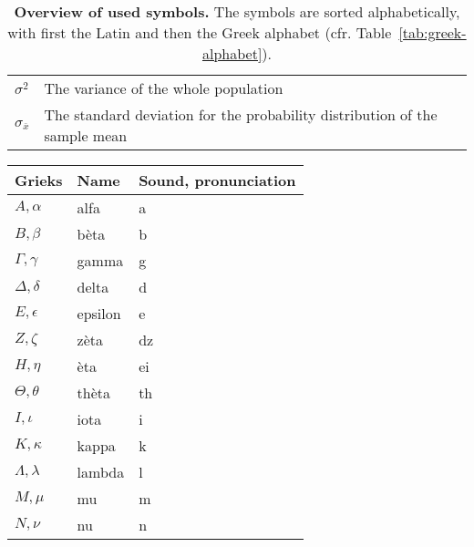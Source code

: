 \begin{table}
\begin{tabular}{p{}p{}}
  	$\sigma^2$                                              & The variance of the whole population                                                                                              \\
  	$\sigma_{\overline{x}}$                                 & The standard deviation for the probability distribution of the sample mean                                                        \\
  	\bottomrule
  \end{tabular}
  \caption[Overview of used symbols.]{\textbf{Overview of used symbols.} The symbols are sorted alphabetically, with first the Latin and then the Greek alphabet (cfr. Table~\ref{tab:greek-alphabet}).}
  \label{tab:notatie}
\end{table}

\begin{table}
  \centering
  \begin{tabular}{lll}
  	\toprule
  	\textbf{Grieks}              & \textbf{Name} & \textbf{Sound, pronunciation} \\
  	\midrule
  	$A, \alpha$                  & alfa          & a                           \\
  	$B, \beta$                   & bèta          & b                           \\
  	$\Gamma, \gamma$             & gamma         & g                           \\
  	$\Delta, \delta$             & delta         & d                           \\
  	$E, \epsilon$                & epsilon       & e                           \\
  	$Z, \zeta$                   & zèta          & dz                          \\
  	$H, \eta$                    & èta           & ei                          \\
  	$\Theta, \theta$             & thèta         & th                          \\
  	$I, \iota$                   & iota          & i                           \\
  	$K, \kappa$                  & kappa         & k                           \\
  	$\Lambda, \lambda$           & lambda        & l                           \\
  	$M, \mu$                     & mu            & m                           \\
  	$N, \nu$                     & nu            & n                           \\

\end{tabular}
\end{table}

